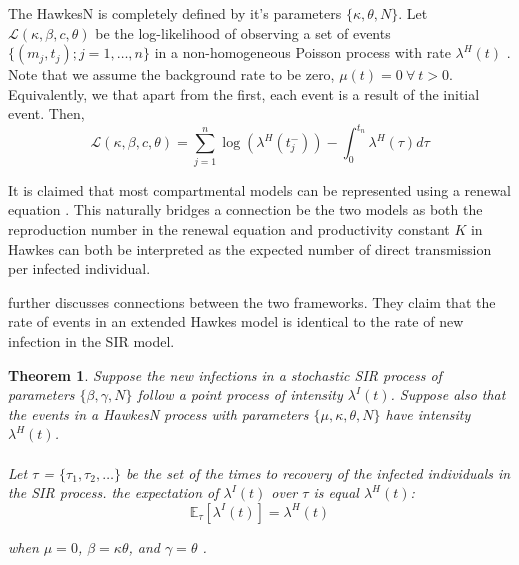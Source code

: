 \documentclass[12pt]{article}
\newtheorem{theorem}{Theorem}
\begin{document}
The HawkesN is completely defined by it's parameters $\{\kappa, \theta, N \}$. Let $\mathcal{L}(\kappa, \beta, c, \theta)$ be the log-likelihood of observing a set of events $\{(m_j, t_j); j = 1, \ldots, n\}$ in a non-homogeneous Poisson process with rate $\lambda^H(t)$ \cite{Rizoiu2018}. Note that we assume the background rate to be zero, $\mu(t) = 0 \ \forall\ t>0$. Equivalently, we that apart from the first, each event is a result of the initial event. Then,
$$
\mathcal{L}(\kappa, \beta, c, \theta) = \sum_{j=1}^n \log (\lambda^H (t_j^-)) - \int_0^{t_n} \lambda^H (\tau) d \tau
$$


It is claimed that most compartmental models can be represented using a renewal equation \cite{Kresin2022}. This naturally bridges a connection be the two models as both the reproduction number in the renewal equation and productivity constant $K$ in Hawkes can both be interpreted as the expected number of direct transmission per infected individual.


\cite{Rizoiu2018} further discusses connections between the two frameworks. They claim that the rate of events in an extended Hawkes model is identical to the rate of new infection in the SIR model. 
\\

\begin{theorem}
\label{Thrm1}
Suppose the new infections in a stochastic SIR process of parameters $\{\beta, \gamma, N\}$ follow a point process of intensity $\lambda^I(t)$. Suppose also that the events in a HawkesN process with parameters $\{\mu, \kappa, \theta, N\}$ have intensity $\lambda^H (t)$. 
\\
\\
Let $\tau$ = $\{\tau_1, \tau_2, \ldots \}$ be the set of the times to recovery of the infected individuals in the SIR process. the expectation of $\lambda^I (t)$ over $\tau$ is equal $\lambda^H (t)$:
$$
\mathbb{E}_\tau [ \lambda^I (t)] = \lambda^H (t)$$

when $\mu = 0$, $\beta = \kappa \theta$, and $\gamma = \theta$ \cite{Rizoiu2018}. 
\end{theorem}
\end{document}
